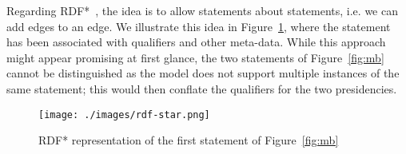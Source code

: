 Regarding RDF*~\cite{Hartig17}, the idea is to allow statements about statements, i.e. we can add edges to an edge. We illustrate this idea in Figure~\ref{fig:rdf-star}, where the statement  has been associated with qualifiers and other meta-data.  While this approach might appear promising at first glance, the two statements of Figure~\ref{fig:mb} cannot be distinguished as the model does not support multiple instances of the same statement; this would then conflate the qualifiers for the two presidencies.

\begin{figure}[t]
\centering
\texttt{[image: ./images/rdf-star.png]}
\caption{RDF* representation of the first statement of Figure~\ref{fig:mb} \label{fig:rdf-star}}
\end{figure}






